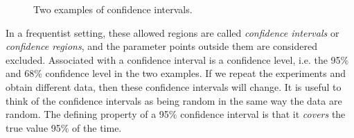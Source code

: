 \documentclass{cernrep}
\begin{document}
  
\begin{figure}[h]
\begin{center}
%
\caption{Two examples of confidence intervals.}
\label{fig:confidenceIntervals}
\end{center}
\end{figure}

In a frequentist setting, these allowed regions are called \textit{confidence intervals} or \textit{confidence regions}, and the parameter points outside them are considered excluded.  Associated with a confidence interval is a confidence level, i.e. the 95\% and 68\% confidence level in the two examples.  If we repeat the experiments and obtain different data, then these confidence intervals will change.  It is useful to think of the confidence intervals as being random  in the same way the data are random.  The defining property of a 95\% confidence interval is that it \textit{covers} the true value 95\% of the time.  
\end{document}
